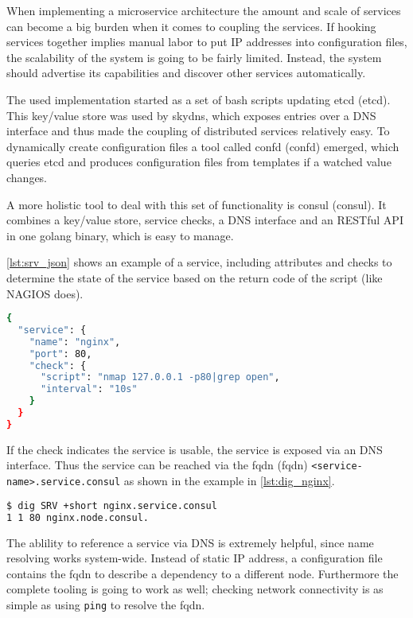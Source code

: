 When implementing a microservice architecture the amount and scale of services can become a big burden when it comes to coupling the services.
If hooking services together implies manual labor to put IP addresses into configuration files, the scalability of the system is going to be fairly limited.
Instead, the system should advertise its capabilities and discover other services automatically.

The used implementation started as a set of bash scripts updating \gls{etcd} (\glsdesc{etcd}).
This key/value store was used by \gls{skydns}, which exposes entries
over a DNS interface and thus made the coupling of distributed services relatively easy. To dynamically create configuration files a tool called
\gls{confd} (\glsdesc{confd}) emerged, which queries \gls{etcd} and produces configuration files from templates if a watched value changes.

A more holistic tool to deal with this set of functionality is \gls{consul} (\glsdesc{consul}). It combines a key/value store, service checks,
a DNS interface and an RESTful API in one golang binary, which is easy to manage.

\autoref{lst:srv_json} shows an example of a service, including attributes and checks to determine the state of the service based on the return code of the script (like NAGIOS does). 

\begin{lstlisting}[language=bash,
    caption={Service definition within \gls{consul}. If the keyword \texttt{open} is not found within the nmap output the service is set into a warning state.},
    label={lst:srv_json}]
{
  "service": {
    "name": "nginx",
    "port": 80,
    "check": {
      "script": "nmap 127.0.0.1 -p80|grep open",
      "interval": "10s"
    }
  }
}
\end{lstlisting}

If the check indicates the service is usable, the service is exposed via an DNS interface.
Thus the service can be reached via the \gls{fqdn} (\glsdesc{fqdn}) \lstinline{<service-name>.service.consul}
as shown in the example in \autoref{lst:dig_nginx}.
\begin{lstlisting}[language=bash,
    caption={DNS query of \lstinline{nginx} service, issued with \texttt{dig}, a common DNS resolver.},
    label={lst:dig_nginx}]
$ dig SRV +short nginx.service.consul
1 1 80 nginx.node.consul.
\end{lstlisting}

The ablility to reference a service via DNS is extremely helpful, since name resolving works system-wide. Instead of static IP address,
a configuration file contains the \gls{fqdn} to describe a dependency to a different node. Furthermore the complete tooling
is going to work as well; checking network connectivity is as simple as using \lstinline{ping} to resolve the \gls{fqdn}.

